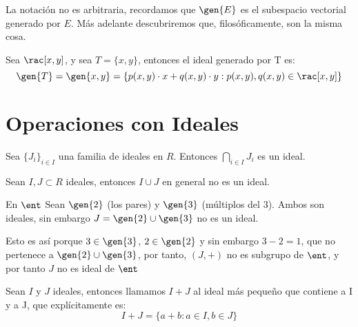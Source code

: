 La notación no es arbitraria, recordamos que $\gen{E}$ es el subespacio vectorial generado por $E$. Más adelante descubriremos que, filosóficamente, son la misma cosa.

\begin{example} Sea $\rac[x,y]$, y sea $T=\{x,y\}$, entonces el ideal generado por T es:
	$$\gen{T} = \gen{x,y} = \{p(x,y)\cdot x+q(x,y)\cdot y : p(x,y),q(x,y) \in \rac[x,y]\}$$
\end{example}

\section{Operaciones con Ideales}

\begin{prop}
	Sea $\{J_i\}_{i\in I}$ una familia de ideales en $R$. Entonces $\bigcap_{i \in I}J_i$ es un ideal.
\end{prop}


\begin{prop}
	Sean $I,J \subset R$ ideales, entonces $I \cup J$ en general no es un ideal.
\end{prop}

\begin{example} En $\ent$
	Sean $\gen{2}$ (los pares) y $\gen{3}$ (múltiplos del 3). Ambos son ideales, sin embargo $J=\gen{2} \cup \gen{3}$ no es un ideal.

	Esto es así porque $3\in \gen{3}$, $2 \in \gen{2}$ y sin embargo $3-2=1$, que no pertenece a $\gen{2} \cup \gen{3}$, por tanto, $(J,+)$ no es subgrupo de $\ent$, y por tanto $J$ no es ideal de $\ent$
\end{example}

\begin{defn}
Sean $I$ y $J$ ideales, entonces llamamos $I+J$ al ideal más pequeño que contiene a I y a J, que explícitamente es:
$$ I+J = \{a+b: a\in I, b\in J\} $$



\end{defn}

